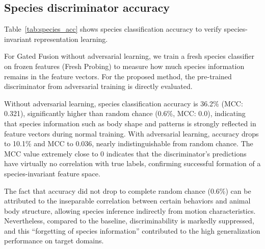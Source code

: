 \documentclass[twocolumn]{svjour3}
\begin{document}
\subsection{Species discriminator accuracy}

Table~\ref{tab:species_acc} shows species classification accuracy to verify species-invariant representation learning.

\begin{table}[t]
  \caption{Species discriminator classification accuracy}
  \label{tab:species_acc}
\end{table}

For Gated Fusion without adversarial learning, we train a fresh species classifier on frozen features (Fresh Probing) to measure how much species information remains in the feature vectors.
For the proposed method, the pre-trained discriminator from adversarial training is directly evaluated.

Without adversarial learning, species classification accuracy is 36.2\% (MCC: 0.321), significantly higher than random chance (0.6\%, MCC: 0.0), indicating that species information such as body shape and patterns is strongly reflected in feature vectors during normal training.
With adversarial learning, accuracy drops to 10.1\% and MCC to 0.036, nearly indistinguishable from random chance.
The MCC value extremely close to 0 indicates that the discriminator's predictions have virtually no correlation with true labels, confirming successful formation of a species-invariant feature space.

The fact that accuracy did not drop to complete random chance (0.6\%) can be attributed to the inseparable correlation between certain behaviors and animal body structure, allowing species inference indirectly from motion characteristics.
Nevertheless, compared to the baseline, discriminability is markedly suppressed, and this ``forgetting of species information'' contributed to the high generalization performance on target domains.
\end{document}
